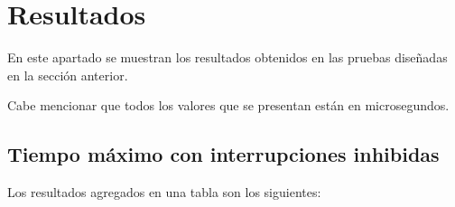 \documentclass[../main.tex]{subfiles}
\begin{document}
\section{Resultados}

En este apartado se muestran los resultados obtenidos en las pruebas diseñadas en la sección anterior.

Cabe mencionar que todos los valores que se presentan están en microsegundos.

\subsection{Tiempo máximo con interrupciones inhibidas}

Los resultados agregados en una tabla son los siguientes:
\end{document}

